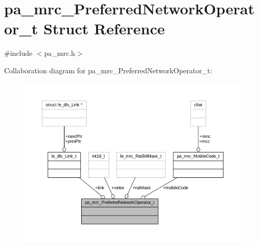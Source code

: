 \hypertarget{structpa__mrc___preferred_network_operator__t}{}\section{pa\+\_\+mrc\+\_\+\+Preferred\+Network\+Operator\+\_\+t Struct Reference}
\label{structpa__mrc___preferred_network_operator__t}


{\ttfamily \#include $<$pa\+\_\+mrc.\+h$>$}



Collaboration diagram for pa\+\_\+mrc\+\_\+\+Preferred\+Network\+Operator\+\_\+t\+:
\nopagebreak
\begin{figure}[H]
\begin{center}
\leavevmode
\includegraphics[width=350pt]{structpa__mrc___preferred_network_operator__t__coll__graph}
\end{center}
\end{figure}
